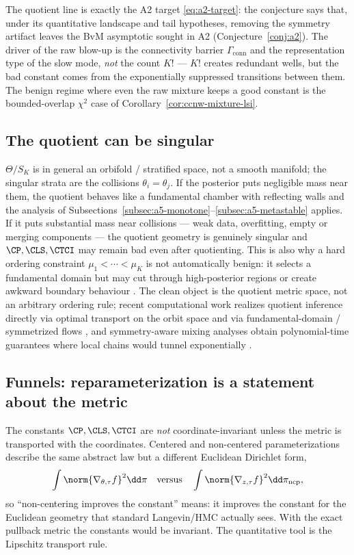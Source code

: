 \documentclass[../../main.tex]{subfiles}
\begin{document}
\noindent The quotient line is exactly the A2 target \eqref{eq:a2-target}: the conjecture says
that, under its quantitative landscape and tail hypotheses, removing the symmetry artifact leaves
the BvM asymptotic sought in A2 (Conjecture~\ref{conj:a2}). The driver of the raw blow-up is the connectivity barrier
$\Gamma_{\mathrm{conn}}$ and the representation
type of the slow mode, \emph{not} the count $K!$ --- $K!$ creates redundant wells, but the bad
constant comes from the exponentially suppressed transitions between them. The benign regime
where even the raw mixture keeps a good constant is the bounded-overlap $\chi^2$ case of
Corollary~\ref{cor:ccnw-mixture-lsi}.

\subsection{The quotient can be singular}
\label{subsec:a5-singular}

$\Theta/S_K$ is in general an orbifold / stratified space, not a smooth manifold; the singular
strata are the collisions $\theta_i=\theta_j$. If the posterior puts negligible mass near them,
the quotient behaves like a fundamental chamber with reflecting walls and the analysis of
Subsections~\ref{subsec:a5-monotone}--\ref{subsec:a5-metastable} applies. If it puts
substantial mass near collisions --- weak data, overfitting, empty or merging components ---
the quotient geometry is genuinely singular and $\CP,\CLS,\CTCI$ may remain bad even after
quotienting. This is also why a hard ordering constraint $\mu_1<\cdots<\mu_K$ is not
automatically benign: it selects a fundamental domain but may cut through high-posterior regions
or create awkward boundary behaviour \cite{Stephens2000,JasraHolmesStephens2005}. The clean
object is the quotient metric space, not an arbitrary ordering rule; recent computational work
realizes quotient inference directly via optimal transport on the orbit space
\cite{MonteillerEtAl2019} and via fundamental-domain / symmetrized flows
\cite{FoldedTransport2026}, and symmetry-aware mixing analyses obtain polynomial-time guarantees
where local chains would tunnel exponentially \cite{MouEtAl2019}.

\subsection{Funnels: reparameterization is a statement about the metric}
\label{subsec:a5-funnel}

The constants $\CP,\CLS,\CTCI$ are \emph{not} coordinate-invariant unless the metric is
transported with the coordinates. Centered and non-centered parameterizations describe the same
abstract law but a different Euclidean Dirichlet form,
\[
  \int\norm{\nabla_{\theta,\tau}f}^2\dd\pi
  \quad\text{versus}\quad
  \int\norm{\nabla_{z,\tau}f}^2\dd\pi_{\mathrm{ncp}},
\]
so ``non-centering improves the constant'' means: it improves the constant for the Euclidean
geometry that standard Langevin/HMC actually sees. With the exact pullback metric the constants
would be invariant. The quantitative tool is the Lipschitz transport rule.
\end{document}

